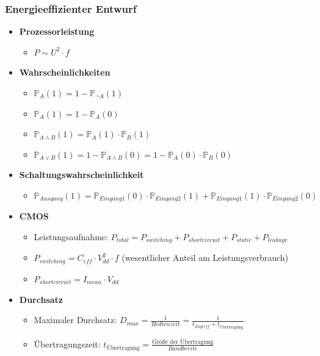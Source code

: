 \subsubsection{Energieeffizienter Entwurf}
\begin{itemize}
	\item \textbf{Prozessorleistung}
	\begin{itemize}
		\item \(P \sim U^2 \cdot f\)
	\end{itemize}
	\item \textbf{Wahrscheinlichkeiten}
	\begin{itemize}
		\item \(\mathbb{P}_A(1) = 1 - \mathbb{P}_{\neg A}(1)\)
		\item \(\mathbb{P}_A(1) = 1 - \mathbb{P}_A(0)\)
		\item \(\mathbb{P}_{A \land B}(1) = \mathbb{P}_A(1) \cdot \mathbb{P}_B(1)\)
		\item \(\mathbb{P}_{A \lor B}(1) = 1 - \mathbb{P}_{A \land B}(0) = 1 - \mathbb{P}_A(0) \cdot \mathbb{P}_B(0)\)
	\end{itemize}
	\item \textbf{Schaltungswahrscheinlichkeit}
	\begin{itemize}
		\item \(\mathbb{P}_{Ausgang}(1) = \mathbb{P}_{Eingang1}(0) \cdot \mathbb{P}_{Eingang2}(1) + \mathbb{P}_{Eingang1}(1) \cdot \mathbb{P}_{Eingang2}(0)\)
	\end{itemize}
	\item \textbf{CMOS}
	\begin{itemize}
		\item Leistungsaufnahme: \(P_{total} = P_{switching} + P_{shortcircuit} + P_{static} + P_{leakage}\)
		\item \(P_{switching} = C_{eff} \cdot V_{dd}^2 \cdot f\) (wesentlicher Anteil am Leistungsverbrauch)
		\item \(P_{shortcircuit} = I_{mean} \cdot V_{dd}\)
	\end{itemize}
	\item \textbf{Durchsatz}
	\begin{itemize}
		\item Maximaler Durchsatz: \(D_{max} = \frac{1}{Bedienzeit} = \frac{1}{t_{Zugriff} + t_{\text{Übertragung}}}\)
		\item Übertragungszeit: \(t_{\text{Übertragung}} = \frac{\text{Größe der Übertragung}}{Bandbreite}\)
	\end{itemize}
\end{itemize}

